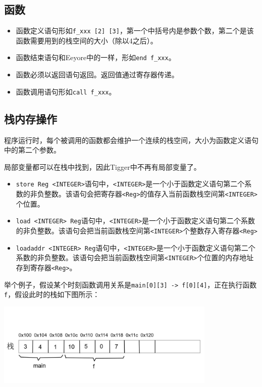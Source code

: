 \documentclass{ctexart}
\begin{document}
\subsection{函数}
\begin{itemize}
\item
函数定义语句形如\texttt{f\_xxx [2] [3]}，第一个中括号内是参数个数，第二个是该函数需要用到的栈空间的大小（除以4之后）。

\item
函数结束语句和Eeyore中的一样，形如\texttt{end f\_xxx}。

\item
函数必须以返回语句返回。返回值通过寄存器传递。

\item
函数调用语句形如\texttt{call f\_xxx}。
\end{itemize}
\subsection{栈内存操作}
程序运行时，每个被调用的函数都会维护一个连续的栈空间，大小为函数定义语句中的第二个参数。

局部变量都可以在栈中找到，因此Tigger中不再有局部变量了。

\begin{itemize}
\item
\texttt{store Reg <INTEGER>}语句中，\texttt{<INTEGER>}是一个小于函数定义语句第二个系数的非负整数。该语句会把寄存器\texttt{<Reg>}的值存入当前函数栈空间第\texttt{<INTEGER>}个位置。

\item
\texttt{load <INTEGER> Reg}语句中，\texttt{<INTEGER>}是一个小于函数定义语句第二个系数的非负整数。该语句会把当前函数栈空间第\texttt{<INTEGER>}个整数存入寄存器\texttt{<Reg>}

\item
\texttt{loadaddr <INTEGER> Reg}语句中，\texttt{<INTEGER>}是一个小于函数定义语句第二个系数的非负整数。该语句会把当前函数栈空间第\texttt{<INTEGER>}个位置的内存地址存到寄存器\texttt{<Reg>}。
\end{itemize}

举个例子，假设某个时刻函数调用关系是\texttt{main[0][3] -> f[0][4]}，正在执行函数\texttt{f}，假设此时的栈如下图所示：

\begin{center}\includegraphics[height=4cm]{stack2}\end{center}
\end{document}
